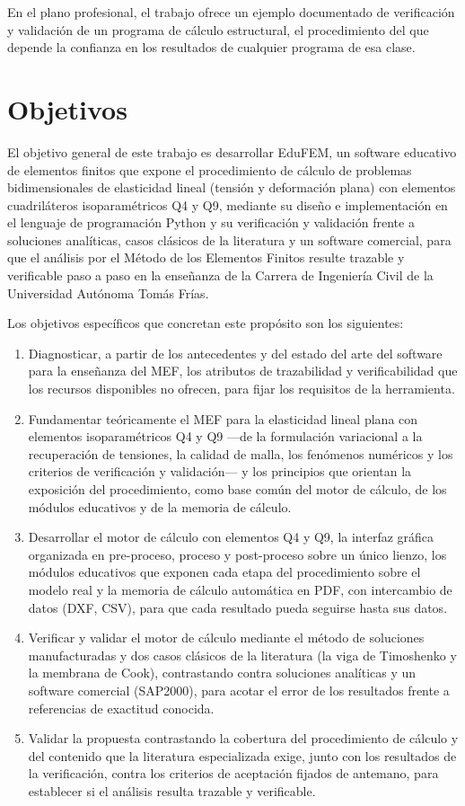 En el plano profesional, el trabajo ofrece un ejemplo documentado de verificación y validación de un programa de cálculo estructural, el procedimiento del que depende la confianza en los resultados de cualquier programa de esa clase.

\section*{Objetivos}

El objetivo general de este trabajo es desarrollar EduFEM, un software educativo de elementos finitos que expone el procedimiento de cálculo de problemas bidimensionales de elasticidad lineal (tensión y deformación plana) con elementos cuadriláteros isoparamétricos Q4 y Q9, mediante su diseño e implementación en el lenguaje de programación Python y su verificación y validación frente a soluciones analíticas, casos clásicos de la literatura y un software comercial, para que el análisis por el Método de los Elementos Finitos resulte trazable y verificable paso a paso en la enseñanza de la Carrera de Ingeniería Civil de la Universidad Autónoma Tomás Frías.

Los objetivos específicos que concretan este propósito son los siguientes:

\begin{enumerate}
    \item Diagnosticar, a partir de los antecedentes y del estado del arte del software para la enseñanza del MEF, los atributos de trazabilidad y verificabilidad que los recursos disponibles no ofrecen, para fijar los requisitos de la herramienta.
    \item Fundamentar teóricamente el MEF para la elasticidad lineal plana con elementos isoparamétricos Q4 y Q9 —de la formulación variacional a la recuperación de tensiones, la calidad de malla, los fenómenos numéricos y los criterios de verificación y validación— y los principios que orientan la exposición del procedimiento, como base común del motor de cálculo, de los módulos educativos y de la memoria de cálculo.
    \item Desarrollar el motor de cálculo con elementos Q4 y Q9, la interfaz gráfica organizada en pre-proceso, proceso y post-proceso sobre un único lienzo, los módulos educativos que exponen cada etapa del procedimiento sobre el modelo real y la memoria de cálculo automática en PDF, con intercambio de datos (DXF, CSV), para que cada resultado pueda seguirse hasta sus datos.
    \item Verificar y validar el motor de cálculo mediante el método de soluciones manufacturadas y dos casos clásicos de la literatura (la viga de Timoshenko y la membrana de Cook), contrastando contra soluciones analíticas y un software comercial (SAP2000), para acotar el error de los resultados frente a referencias de exactitud conocida.
    \item Validar la propuesta contrastando la cobertura del procedimiento de cálculo y del contenido que la literatura especializada exige, junto con los resultados de la verificación, contra los criterios de aceptación fijados de antemano, para establecer si el análisis resulta trazable y verificable.
\end{enumerate}

